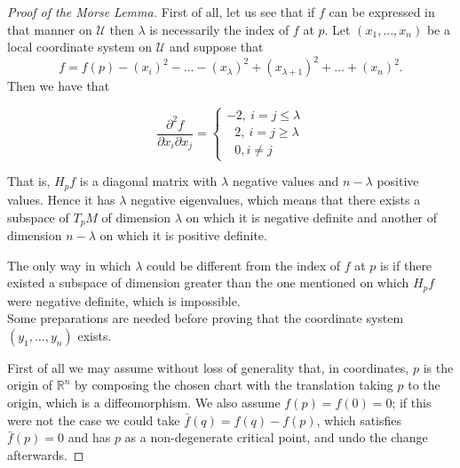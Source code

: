 \begin{proof}[Proof of the Morse Lemma]
    First of all, let us see that if $f$ can be expressed in that manner on $\mathcal{U}$ then $\lambda$ is necessarily the index of $f$ at $p$. Let $(x_1,\dots, x_n)$ be a local coordinate system on $\mathcal{U}$ and suppose that
    \begin{equation*}
        f=f(p)-(x_i)^2-\dots-(x_\lambda)^2 + (x_{\lambda +1})^2+\dots + (x_n)^2. %
    \end{equation*}
    Then we have that

    \[
        \frac{\partial^2 f}{\partial x_i \partial x_j}=
        \begin{cases}
            -2, ~i=j\le \lambda\\
            ~~~2, ~i=j\ge \lambda\\ %
            ~~~0, i\neq j
        \end{cases}
    \]

    That is, $H_pf$ is a diagonal matrix with $\lambda$ negative values and $n-\lambda$ positive values. Hence it has $\lambda$ negative eigenvalues, which means that there exists a subspace of $T_pM$ of dimension $\lambda$ on which it is negative definite and another of dimension $n-\lambda$ on which it is positive definite.

    The only way in which $\lambda$ could be different from the index of $f$ at $p$ is if there existed a subspace of dimension greater than the one mentioned on which $H_pf$ were negative definite, which is impossible.\\


    Some preparations are needed before proving that the coordinate system $(y_1,\dots,y_n)$ exists.

    First of all we may assume without loss of generality that, in coordinates, $p$ is the origin of $\mathbb{R}^n$ by composing the chosen chart with the translation taking $p$ to the origin, which is a diffeomorphism. We also assume $f(p)=f(0)=0$; if this were not the case we could take $\bar{f}(q)=f(q)-f(p)$, which satisfies $\bar{f}(p)=0$ and has $p$ as a non-degenerate critical point, and undo the change afterwards.


\end{proof}
